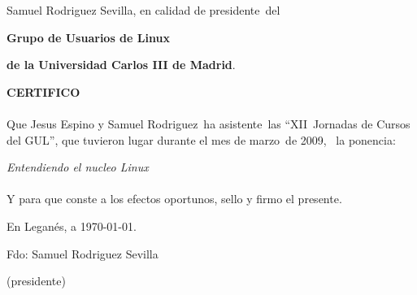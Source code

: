 \documentclass[12pt,a4paper,oneside,titlepage]{article}
\newcommand\firmante{Samuel Rodriguez Sevilla}
\newcommand\cargo{presidente}
\newcommand\ponente{Jesus Espino y Samuel Rodriguez}
\newcommand\ponencia{Entendiendo el nucleo Linux}
\newcommand\jornadas{XII}
\newcommand\mes{marzo}
\newcommand\anio{2009}
\newcommand\tipo{asistente}
\newcommand\accion{}
\begin{document}

	\bigskip
	\centerline{\firmante, en calidad de \cargo\ del}
	\centerline{\textbf{Grupo de Usuarios de Linux}}
	\centerline{\textbf{de la Universidad Carlos III de Madrid}.}

	\vspace{2cm}
	\centerline{\textbf{\Large CERTIFICO}}
	\vspace{1cm}

	\paragraph{}Que \ponente\ ha \tipo\ las “\jornadas\ Jornadas de Cursos del GUL”, que tuvieron lugar durante el mes de \mes\ de \anio, \accion\ la ponencia:

	\vspace{7mm}
	\centerline{\textit{\large \ponencia}}
	\vspace{3mm}

	\paragraph{}Y para que conste a los efectos oportunos, sello y firmo el presente.
	
	\bigskip
	\centerline{En Leganés, a \today.}
	\vspace{3cm}

	\centerline{Fdo: \firmante}
	\centerline{(\cargo)}
\end{document}
